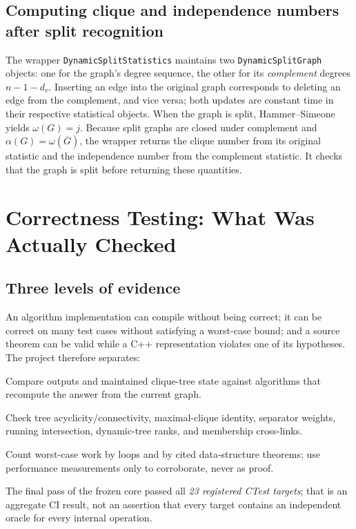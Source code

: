 \subsection{Computing clique and independence numbers after split recognition}
The wrapper \texttt{DynamicSplitStatistics} maintains two \texttt{DynamicSplitGraph} objects: one for the graph's degree sequence, the other for its \emph{complement} degrees \(n-1-d_v\).  Inserting an edge into the original graph corresponds to deleting an edge from the complement, and vice versa; both updates are constant time in their respective statistical objects.  When the graph is split, Hammer--Simeone yields \(\omega(G)=j\).  Because split graphs are closed under complement and \(\alpha(G)=\omega(\overline G)\), the wrapper returns the clique number from its original statistic and the independence number from the complement statistic.  It checks that the graph is split before returning these quantities.

\section{Correctness Testing: What Was Actually Checked}
\label{sec:test-full}
\subsection{Three levels of evidence}
An algorithm implementation can compile without being correct; it can be correct on many test cases without satisfying a worst-case bound; and a source theorem can be valid while a C++ representation violates one of its hypotheses.  The project therefore separates:
\begin{description}[leftmargin=3cm,style=nextline]
\item[Functional evidence] Compare outputs and maintained clique-tree state against algorithms that recompute the answer from the current graph.
\item[Structural evidence] Check tree acyclicity/connectivity, maximal-clique identity, separator weights, running intersection, dynamic-tree ranks, and membership cross-links.
\item[Complexity arguments] Count worst-case work by loops and by cited data-structure theorems; use performance measurements only to corroborate, never as proof.
\end{description}
The final pass of the frozen core passed all \emph{23 registered CTest targets}; that is an aggregate CI result, not an assertion that every target contains an independent oracle for every internal operation.

